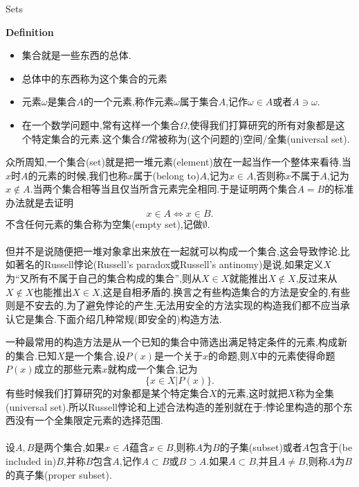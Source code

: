 \begin{frame}{Sets}
\begin{block}{\textbf{Definition}}
\begin{itemize}
\item \alert{集合}就是一些东西的总体.
\item 总体中的东西称为这个集合的\alert{元素}
\item 元素$\omega$是集合$A$的一个元素,称作元素$\omega$属于集合$A$,记作$\omega\in A$或者$A\ni\omega$.
\item 在一个数学问题中,常有这样一个集合$\Omega$,使得我们打算研究的所有对象都是这个特定集合的元素.这个集合$\Omega$常被称为(这个问题的)\alert{空间/全集}(universal set).
\end{itemize}	
\end{block}
\end{frame}

\begin{frame}
	众所周知,一个\alert{集合}(set)就是把一堆\alert{元素}(element)放在一起当作一个整体来看待.当$x$时$A$的元素的时候,我们也称$x$\alert{属于}(belong to)$A$,记为$x\in A$,否则称$x$不属于$A$,记为$x\notin A$.当两个集合相等当且仅当所含元素完全相同.于是证明两个集合$A=B$的标准办法就是去证明\begin{equation}
		x\in A\Longleftrightarrow x\in B.
	\end{equation}
	不含任何元素的集合称为\alert{空集}(empty set),记做$\emptyset$.
	\\ \hspace*{\fill} \\%
	但并不是说随便把一堆对象拿出来放在一起就可以构成一个集合,这会导致悖论.比如著名的\alert{Russell悖论}(Russell's paradox或Russell's antinomy)是说,如果定义$X$为“又所有不属于自己的集合构成的集合”,则从$X\in X$就能推出$X\notin X$,反过来从$X\notin X$也能推出$X\in X$,这是自相矛盾的.换言之有些构造集合的方法是安全的,有些则是不安去的,为了避免悖论的产生,无法用安全的方法实现的构造我们都不应当承认它是集合.下面介绍几种常规(即安全的)构造方法.
\end{frame}

\begin{frame}
	一种最常用的构造方法是从一个已知的集合中筛选出满足特定条件的元素,构成新的集合.已知$X$是一个集合,设$P(x)$是一个关于$x$的命题,则$X$中的元素使得命题$P(x)$成立的那些元素$x$就构成一个集合,记为\begin{equation}
		\{x\in X|P(x) \}.
	\end{equation}
	有些时候我们打算研究的对象都是某个特定集合$X$的元素,这时就把$X$称为\alert{全集}(universal set).所以Russell悖论和上述合法构造的差别就在于:悖论里构造的那个东西没有一个全集限定元素的选择范围.
	\\ \hspace*{\fill} \\%
	设$A,B$是两个集合,如果$x\in A$蕴含$x\in B$,则称$A$为$B$的\alert{子集}(subset)或者$A$\alert{包含于}(be included in)$B$,并称$B$\alert{包含}$A$,记作$A\subset B$或$B\supset A$.如果$A\subset B$,并且$A\neq B$,则称$A$为$B$的\alert{真子集}(proper subset).
\end{frame}


